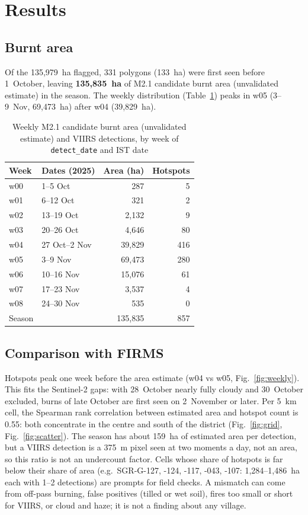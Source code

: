 \documentclass[conference]{IEEEtran}
\newcommand{\AREA}{M2.1 candidate burnt area (unvalidated estimate)}
\begin{document}
\section{Results}
\subsection{Burnt area}
Of the 135{,}979~ha flagged, 331 polygons (133~ha) were first seen before 1~October, leaving
\textbf{135{,}835~ha} of \AREA{} in the season. The weekly distribution (Table~\ref{tab:weekly})
peaks in w05 (3--9~Nov, 69{,}473~ha) after w04 (39{,}829~ha).

\begin{table}[t]
\caption{Weekly \AREA{} and VIIRS detections, by week of \texttt{detect\_date} and IST date}
\label{tab:weekly}
\centering
\small
\begin{tabular}{@{}llrr@{}}
\toprule
Week & Dates (2025) & Area (ha) & Hotspots \\
\midrule
w00 & 1--5 Oct & 287 & 5 \\
w01 & 6--12 Oct & 321 & 2 \\
w02 & 13--19 Oct & 2{,}132 & 9 \\
w03 & 20--26 Oct & 4{,}646 & 80 \\
w04 & 27 Oct--2 Nov & 39{,}829 & 416 \\
w05 & 3--9 Nov & 69{,}473 & 280 \\
w06 & 10--16 Nov & 15{,}076 & 61 \\
w07 & 17--23 Nov & 3{,}537 & 4 \\
w08 & 24--30 Nov & 535 & 0 \\
\midrule
Season & & 135{,}835 & 857 \\
\bottomrule
\end{tabular}
\end{table}

\subsection{Comparison with FIRMS}
Hotspots peak one week before the area estimate (w04 vs w05, Fig.~\ref{fig:weekly}). This fits the
Sentinel-2 gaps: with 28~October nearly fully cloudy and 30~October excluded, burns of late October
are first seen on 2~November or later. Per 5~km cell, the Spearman rank correlation between
estimated area and hotspot count is 0.55: both concentrate in the centre and south of the district
(Fig.~\ref{fig:grid}, Fig.~\ref{fig:scatter}). The season has about 159~ha of estimated area per
detection, but a VIIRS detection is a 375~m pixel seen at two moments a day, not an area, so this
ratio is not an undercount factor. Cells whose share of hotspots is far below their share of area
(e.g.\ SGR-G-127, -124, -117, -043, -107: 1{,}284--1{,}486~ha each with 1--2 detections) are
prompts for field checks. A mismatch can come from off-pass burning, false positives (tilled or
wet soil), fires too small or short for VIIRS, or cloud and haze; it is not a finding about any
village.
\end{document}
